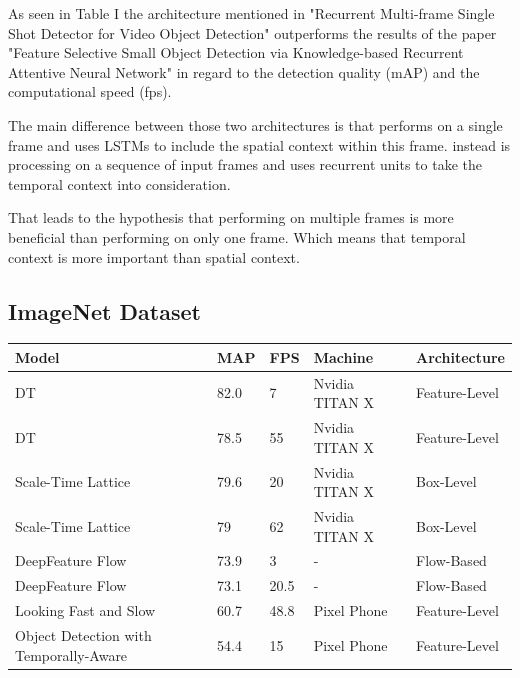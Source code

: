 \documentclass[conference]{IEEEtran}
\begin{document}
As seen in Table I the architecture mentioned in "Recurrent Multi-frame Single Shot Detector for Video Object Detection" \cite{b1} outperforms the results of the paper "Feature Selective Small Object Detection via Knowledge-based Recurrent Attentive Neural Network" \cite{b6} in regard to the detection quality (mAP) and the computational speed (fps). \newline

The main difference between those two architectures is that \cite{b6} performs on a single frame and uses LSTMs to include the spatial context within this frame. \cite{b1} instead is processing on a sequence of input frames and uses recurrent units to take the temporal context into consideration. \newline

That leads to the hypothesis that performing on multiple frames is more beneficial than performing on only one frame. Which means that temporal context is more important than spatial context.   

\subsection{ImageNet Dataset}

\begin{tabular}{ | p{2cm} | p{2em}| p{2em} | p{4em} | p{5em} | } 
 \hline
 Model & MAP & FPS & Machine & Architecture \\
 \hline
 DT \cite{b8} & 82.0 & 7 & Nvidia TITAN X & Feature-Level \\
 \hline
 DT \cite{b8} & 78.5 & 55 & Nvidia TITAN X & Feature-Level \\
 \hline
 Scale-Time Lattice \cite{b10} & 79.6 & 20 & Nvidia TITAN X & Box-Level \\
 \hline
 Scale-Time Lattice \cite{b10} & 79 & 62 & Nvidia TITAN X & Box-Level \\
 \hline
 DeepFeature Flow \cite{b3} & 73.9 & 3 & - & Flow-Based \\
 \hline
 DeepFeature Flow \cite{b3} & 73.1 & 20.5 & - & Flow-Based \\
 \hline
 Looking Fast and Slow \cite{b7} & 60.7 & 48.8 & Pixel Phone & Feature-Level \\
 \hline
 Object Detection with Temporally-Aware \cite{b2} & 54.4 & 15 & Pixel Phone & Feature-Level \\
 \hline
\end{tabular} \newline
\end{document}
